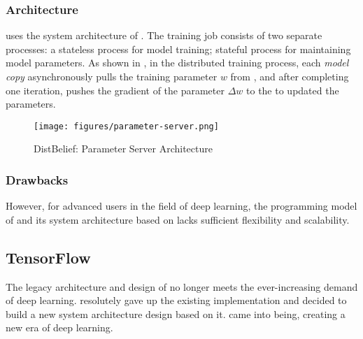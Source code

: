 \begin{content}
\subsubsection{Architecture}
 uses the system architecture of . The training job consists of two separate processes: a stateless  process for model training; stateful  process for maintaining model parameters. As shown in , in the distributed training process, each \emph{model copy} asynchronously pulls the training parameter $w$ from , and after completing one iteration, pushes the gradient of the parameter $ \Delta w $ to the  to updated the parameters.
\begin{figure}[H]
  \centering
  \texttt{[image: figures/parameter-server.png]}
  \caption{DistBelief: Parameter Server Architecture}
  \label{fig:parameter-server}
\end{figure}


\subsubsection{Drawbacks}
However, for advanced users in the field of deep learning, the programming model of  and its system architecture based on  lacks sufficient flexibility and scalability.
\begin{enum}
\end{enum}


\subsection{TensorFlow}
The legacy architecture and design of   no longer meets the ever-increasing demand of deep learning.  resolutely gave up the existing  implementation and decided to build a new system architecture design based on it.  came into being, creating a new era of deep learning.



\end{content}
